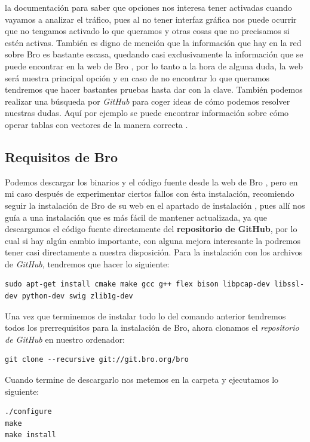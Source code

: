 la documentación para saber que opciones nos interesa tener activadas cuando 
vayamos a analizar el tráfico, pues al no tener interfaz gráfica nos puede 
ocurrir que no tengamos activado lo que queramos y otras cosas que no 
precisamos si estén activas.
\intro
También es digno de mención que la información que hay en la red sobre Bro 
es bastante escasa, quedando casi exclusivamente la información que se puede 
encontrar en la web de Bro \cite{broindex}, por lo tanto a la hora de alguna 
duda, la web será nuestra principal opción y en caso de no encontrar lo que 
queramos tendremos que hacer bastantes pruebas hasta dar con la clave. 
También podemos realizar una búsqueda por \textit{GitHub} para coger ideas de cómo 
podemos resolver nuestras dudas. Aquí por ejemplo se puede encontrar información 
sobre cómo operar tablas con vectores de la manera correcta \cite{gitbeacon}.

\subsection{Requisitos de Bro}

Podemos descargar los binarios y el código fuente desde la web de Bro \cite{brodownload}, 
pero en mi caso después de experimentar ciertos fallos con ésta instalación, 
recomiendo seguir la instalación de Bro de su web en el apartado de instalación \cite{broinstall}, 
pues allí nos guía a una instalación que es más fácil de mantener actualizada, 
ya que descargamos el código fuente directamente del \textbf{repositorio de GitHub}, 
por lo cual si hay algún cambio importante, con alguna mejora interesante 
la podremos tener casi directamente a nuestra disposición.
\intro
Para la instalación con los archivos de \textit{GitHub}, tendremos que hacer lo siguiente:
\intro
\begin{lstlisting}[style=Consola]
sudo apt-get install cmake make gcc g++ flex bison libpcap-dev libssl-dev python-dev swig zlib1g-dev
\end{lstlisting}

\noindent Una vez que terminemos de instalar todo lo del comando anterior tendremos todos los 
prerrequisitos para la instalación de Bro, ahora clonamos el 
\textit{repositorio de GitHub} en nuestro ordenador:
\intro
\begin{lstlisting}[style=Consola]
git clone --recursive git://git.bro.org/bro
\end{lstlisting}

\noindent Cuando termine de descargarlo nos metemos en la carpeta y ejecutamos lo siguiente:
\intro
\begin{lstlisting}[style=Consola]
./configure
make
make install
\end{lstlisting}

